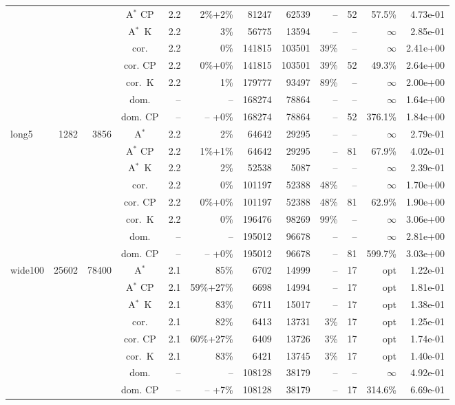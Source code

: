 \documentclass[11pt]{amsart}
\newenvironment{outdent}
{\begin{list}{}{\leftmargin-2cm\rightmargin\leftmargin}\centering\item\relax}
{\end{list}\ignorespacesafterend}
\theoremstyle{plain}
\theoremstyle{remark}
\begin{document}
\begin{table}
\begin{outdent}
\begin{footnotesize}
\begin{tabular}{|l|rrc|rr|rrr|rr|r|}
&&&A$^*$ CP & 2.2 & 2\%+2\% &81247 & 62539 & -- &52 & 57.5\% & 4.73e-01 \\
&&&A$^*$~K & 2.2 & 3\% &56775 & 13594 & -- & -- &$\infty$ & 2.85e-01 \\
&&&cor. & 2.2 & 0\% &141815 & 103501 & 39\% & -- &$\infty$ & 2.41e+00 \\
&&&cor. CP & 2.2 & 0\%+0\% &141815 & 103501 & 39\% &52 & 49.3\% & 2.64e+00 \\
&&&cor.~K & 2.2 & 1\% &179777 & 93497 & 89\% & -- &$\infty$ & 2.00e+00 \\
&&&dom. & -- & --  &168274 & 78864 & -- & -- &$\infty$ & 1.64e+00 \\
&&&dom. CP & -- & -- +0\% &168274 & 78864 & -- &52 & 376.1\% & 1.84e+00 \\
\hline
long5 & 1282 & 3856 & A$^*$ & 2.2 & 2\% &64642 & 29295 & -- & -- &$\infty$ & 2.79e-01 \\
&&&A$^*$ CP & 2.2 & 1\%+1\% &64642 & 29295 & -- &81 & 67.9\% & 4.02e-01 \\
&&&A$^*$~K & 2.2 & 2\% &52538 & 5087 & -- & -- &$\infty$ & 2.39e-01 \\
&&&cor. & 2.2 & 0\% &101197 & 52388 & 48\% & -- &$\infty$ & 1.70e+00 \\
&&&cor. CP & 2.2 & 0\%+0\% &101197 & 52388 & 48\% &81 & 62.9\% & 1.90e+00 \\
&&&cor.~K & 2.2 & 0\% &196476 & 98269 & 99\% & -- &$\infty$ & 3.06e+00 \\
&&&dom. & -- & --  &195012 & 96678 & -- & -- &$\infty$ & 2.81e+00 \\
&&&dom. CP & -- & -- +0\% &195012 & 96678 & -- &81 & 599.7\% & 3.03e+00 \\
\hline
wide100 & 25602 & 78400 & A$^*$ & 2.1 & 85\% &6702 & 14999 & -- &17 & opt & 1.22e-01 \\
&&&A$^*$ CP & 2.1 & 59\%+27\% &6698 & 14994 & -- &17 & opt & 1.81e-01 \\
&&&A$^*$~K & 2.1 & 83\% &6711 & 15017 & -- &17 & opt & 1.38e-01 \\
&&&cor. & 2.1 & 82\% &6413 & 13731 & 3\% &17 & opt & 1.25e-01 \\
&&&cor. CP & 2.1 & 60\%+27\% &6409 & 13726 & 3\% &17 & opt & 1.74e-01 \\
&&&cor.~K & 2.1 & 83\% &6421 & 13745 & 3\% &17 & opt & 1.40e-01 \\
&&&dom. & -- & --  &108128 & 38179 & -- & -- &$\infty$ & 4.92e-01 \\
&&&dom. CP & -- & -- +7\% &108128 & 38179 & -- &17 & 314.6\% & 6.69e-01 \\

\end{tabular}
\end{footnotesize}
\end{outdent}
\end{table}
\end{document}
